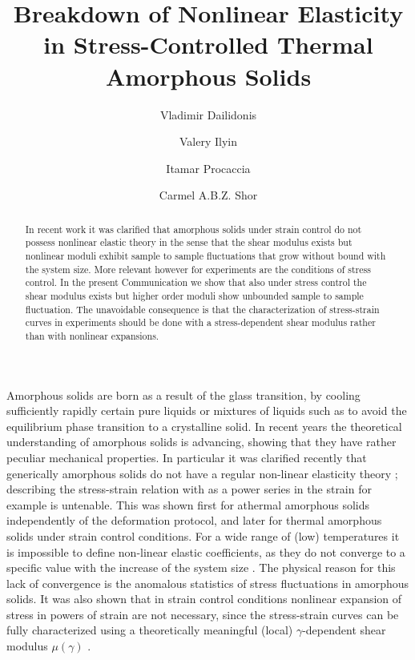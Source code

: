 \documentclass[pre,twocolumn,aps,10pt,superscriptaddress,notitlepage,nofootinbib]{revtex4-1}
\begin{document}
\title{
Breakdown of Nonlinear Elasticity in Stress-Controlled Thermal Amorphous Solids}

\author{Vladimir Dailidonis}

\author{Valery Ilyin}

\author{Itamar Procaccia}


\author{Carmel A.B.Z. Shor}



\begin{abstract}
In recent work it was clarified that amorphous solids under strain control do not possess
nonlinear elastic theory in the sense that the shear modulus exists but nonlinear moduli
exhibit sample to sample fluctuations that grow without bound with the system size. More
relevant however for experiments are the conditions of stress control. In the present
Communication we show that also under stress control the shear modulus exists but higher
order moduli show unbounded sample to sample fluctuation. The unavoidable consequence is that
the characterization of stress-strain curves in experiments should be done with a stress-dependent
shear modulus rather than with nonlinear expansions.
\end{abstract}

\maketitle

Amorphous solids are born as a result of the glass transition, by cooling sufficiently rapidly certain pure liquids or mixtures of liquids such as to avoid the equilibrium phase transition to a crystalline solid. In recent years the theoretical understanding of amorphous solids is advancing, showing that they have rather peculiar mechanical properties. In particular it was clarified recently that generically amorphous solids do not have
a regular non-linear elasticity theory \cite{HentschelKarmakar11,DubeyProcaccia16,PRSS16}; describing the stress-strain relation with as a power series in the strain for example is untenable. This was shown first
 for athermal amorphous solids independently of the deformation protocol, and later for thermal amorphous
 solids under strain control conditions. For a wide range of (low) temperatures it is impossible to define non-linear elastic coefficients, as they do not converge to a specific value with the increase of the system size \cite{PRSS16}. The physical reason for this lack of convergence is the anomalous statistics of stress fluctuations in amorphous solids. It was also shown that in strain control conditions nonlinear expansion of stress in powers of strain are not necessary, since the stress-strain curves can be fully characterized using a theoretically meaningful (local) $\gamma$-dependent shear modulus $\mu(\gamma)$ \cite{DubeyProcaccia16}.
\end{document}
